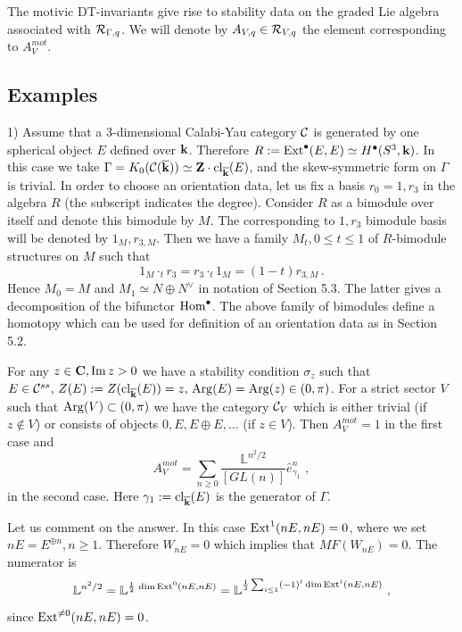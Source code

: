 \documentclass[12pt]{article}
\begin{document}
The motivic DT-invariants give rise to stability data on the graded Lie algebra associated with
${\cal R}_{\Gamma,q}$. We will denote by $A_{V,q}\in {\cal R}_{V,q}$ the element corresponding to
$A_V^{mot}$.






\subsection{Examples}



1) Assume that a $3$-dimensional Calabi-Yau category ${\mathcal C}$ is generated by one spherical object $E$ defined over ${\bf k}$. Therefore $R:=\operatorname{Ext}^{\bullet}(E,E)\simeq H^{\bullet}(S^3,{\bf k})$. In this case we take $\Gamma=K_0({\mathcal C}({\overline{\bf k}}))\simeq {\bf Z}\cdot \operatorname{cl}_{{\overline{\bf k}}}(E)$, and the skew-symmetric form on $\Gamma$ is trivial. In order to choose an orientation data, let us fix a basis $r_0=1,r_3$ in the algebra $R$ (the subscript indicates the degree). Consider $R$ as a bimodule over itself and denote this bimodule by $M$. The corresponding to $1,r_3$ bimodule basis will be denoted by $1_M,r_{3,M}$. Then we have a family $M_t, 0\le t\le 1$ of $R$-bimodule structures on $M$ such that 
$$1_{M}\cdot_t r_3=r_3\cdot_t 1_{M}=(1-t)r_{3,M}\,.$$
 Hence $M_0=M$ and $M_1\simeq N\oplus N^{\vee}$ in notation of Section 5.3. The latter gives a decomposition of the  bifunctor $\operatorname{Hom}^\bullet$. The above family of bimodules define a homotopy which can be used for definition of an orientation data as in Section 5.2.

For any $z\in {\bf C}, \operatorname{Im}z>0$ we have a stability condition $\sigma_z$ such that $E\in {\mathcal C}^{ss}, \,Z(E):=Z(\operatorname{cl}_{\overline{\bf k}}(E))=z,\, \operatorname{Arg}(E)=\operatorname{Arg}(z)\in (0,\pi)$.
For a strict sector $V$ such that $\operatorname{Arg}(V)\subset (0,\pi)$ we have the category ${\mathcal C}_V$ which is either trivial (if $z\notin V$) or consists of objects $0,E,E\oplus E,\dots$ (if $z\in V$).
Then $A_V^{mot}=1$ in the first case and
$$A_V^{mot}=\sum_{n\geqslant 0}\frac{{\mathbb L}^{n^2/2}}{[GL(n)]}\hat{e}_{\gamma_1}^n\,\,,$$
in the second case. Here  $\gamma_1:={\operatorname{cl}_{\overline{\bf k}}(E)}$ is the generator of $\Gamma$.

Let us comment on the answer.
In this case $\operatorname{Ext}^1(nE,nE)=0$, where we set $nE=E^{\oplus n}, n\geqslant 1$. Therefore $W_{nE}=0$ which implies that $MF(W_{nE})=0$.
The numerator is
$${\mathbb L}^{n^2/2}={\mathbb L}^{{1\over{2}}\,\dim \operatorname{Ext}^0(nE,nE)}=
{\mathbb L}^{{1\over{2}}\sum_{i\le 1}(-1)^i \dim \operatorname{Ext}^i(nE,nE)}\,\,,$$
since $\operatorname{Ext}^{\ne 0}(nE,nE)=0$.
\end{document}
